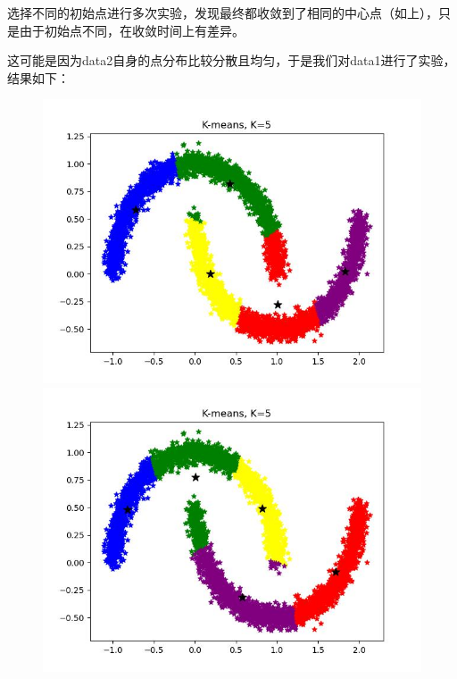 \documentclass[UTF8]{ctexart}
\begin{document}
\begin{figure}[H]
\end{figure}

选择不同的初始点进行多次实验，发现最终都收敛到了相同的中心点（如上），只是由于初始点不同，在收敛时间上有差异。

这可能是因为data2自身的点分布比较分散且均匀，于是我们对data1进行了实验，结果如下：


\begin{figure}[H]
	\centering
  \begin{minipage}{0.32\linewidth}
		\centering
		\includegraphics[width=0.9\linewidth]{no1-1.jpg}
	\end{minipage}
	\begin{minipage}{0.32\linewidth}
		\centering
		\includegraphics[width=0.9\linewidth]{no1-2.jpg}
	\end{minipage}
  \begin{minipage}{0.32\linewidth}
		\centering

\end{minipage}
\end{figure}
\end{document}
